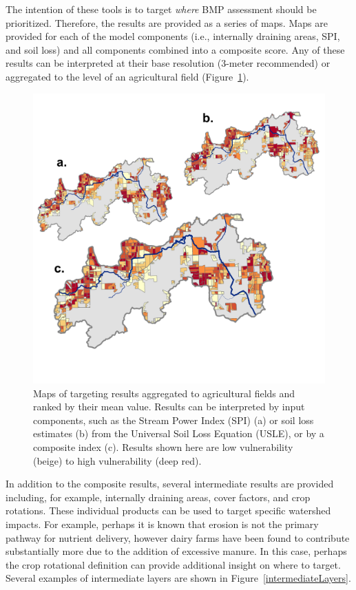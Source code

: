 \documentclass[12pt]{article}
\begin{document}
The intention of these tools is to target \emph{where} BMP assessment should be prioritized. Therefore, the results are provided as a series of maps. Maps are provided for each of the model components (i.e., internally draining areas, SPI, and soil loss) and all components combined into a composite score. Any of these results can be interpreted at their base resolution (3-meter recommended) or aggregated to the level of an agricultural field (Figure~\ref{fieldScaleTargeting}).

\begin{figure}
  \centering
    \includegraphics[width=\textwidth]{fieldScaleTargeting}
  \caption{Maps of targeting results aggregated to agricultural fields and ranked by their mean value. Results can be interpreted by input components, such as the Stream Power Index (SPI) (a) or soil loss estimates (b) from the Universal Soil Loss Equation (USLE), or by a composite index (c). Results shown here are low vulnerability (beige) to high vulnerability (deep red).}
  \label{fieldScaleTargeting}
\end{figure}

In addition to the composite results, several intermediate results are provided including, for example, internally draining areas, cover factors, and crop rotations. These individual products can be used to target specific watershed impacts. For example, perhaps it is known that erosion is not the primary pathway for nutrient delivery, however dairy farms have been found to contribute substantially more due to the addition of excessive manure. In this case, perhaps the crop rotational definition can provide additional insight on where to target. Several examples of intermediate layers are shown in Figure~\ref{intermediateLayers}.
\end{document}
